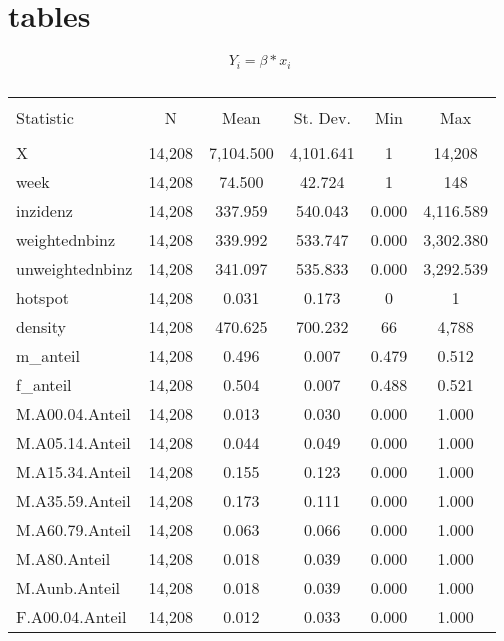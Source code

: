 \documentclass{article}
\begin{document}
\section{tables}


\begin{equation}

	Y_i = \beta * x_i

\end{equation}

\begin{table}[!htbp] \centering 
  \caption{} 
  \label{} 
\begin{tabular}{@{\extracolsep{5pt}}lccccc} 
\\[-1.8ex]\hline 
\hline \\[-1.8ex] 
Statistic & \multicolumn{1}{c}{N} & \multicolumn{1}{c}{Mean} & \multicolumn{1}{c}{St. Dev.} & \multicolumn{1}{c}{Min} & \multicolumn{1}{c}{Max} \\ 
\hline \\[-1.8ex] 
X & 14,208 & 7,104.500 & 4,101.641 & 1 & 14,208 \\ 
week & 14,208 & 74.500 & 42.724 & 1 & 148 \\ 
inzidenz & 14,208 & 337.959 & 540.043 & 0.000 & 4,116.589 \\ 
weightednbinz & 14,208 & 339.992 & 533.747 & 0.000 & 3,302.380 \\ 
unweightednbinz & 14,208 & 341.097 & 535.833 & 0.000 & 3,292.539 \\ 
hotspot & 14,208 & 0.031 & 0.173 & 0 & 1 \\ 
density & 14,208 & 470.625 & 700.232 & 66 & 4,788 \\ 
m\_anteil & 14,208 & 0.496 & 0.007 & 0.479 & 0.512 \\ 
f\_anteil & 14,208 & 0.504 & 0.007 & 0.488 & 0.521 \\ 
M.A00.04.Anteil & 14,208 & 0.013 & 0.030 & 0.000 & 1.000 \\ 
M.A05.14.Anteil & 14,208 & 0.044 & 0.049 & 0.000 & 1.000 \\ 
M.A15.34.Anteil & 14,208 & 0.155 & 0.123 & 0.000 & 1.000 \\ 
M.A35.59.Anteil & 14,208 & 0.173 & 0.111 & 0.000 & 1.000 \\ 
M.A60.79.Anteil & 14,208 & 0.063 & 0.066 & 0.000 & 1.000 \\ 
M.A80.Anteil & 14,208 & 0.018 & 0.039 & 0.000 & 1.000 \\ 
M.Aunb.Anteil & 14,208 & 0.018 & 0.039 & 0.000 & 1.000 \\ 
F.A00.04.Anteil & 14,208 & 0.012 & 0.033 & 0.000 & 1.000 \\ 

\end{tabular}
\end{table}
\end{document}
